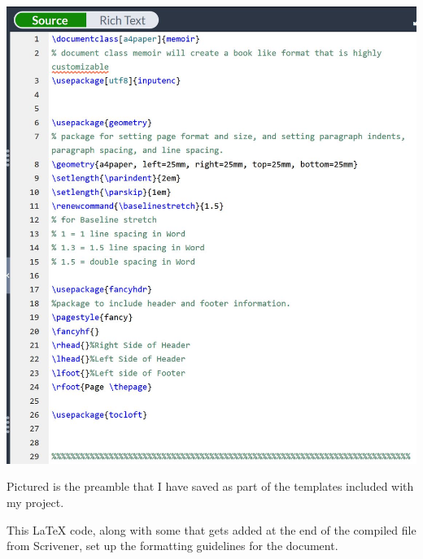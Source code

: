 \documentclass[unknownkeysallowed,usepdftitle=false, aspectratio=169,parskip=full]{beamer}
\newcommand{\secvariable}{nothing}
\newcommand{\mysection}[1]{\renewcommand{\secvariable}{#1}
}
\begin{document}
\mysection{line}
\begin{frame}\label{\secvariable}
\begin{center}
  \vspace{-0.5cm}
 \includegraphics[height=0.65\textheight,keepaspectratio]{Images/OverleafCode.JPG}
\end{center}
  \vspace{-0.5cm}
  
  Pictured is the preamble that I have saved as part of the templates included with my project. 
  
  This LaTeX code, along with some that gets added at the end of the compiled file from Scrivener, set up the formatting guidelines for the document.

  
\end{frame}
\end{document}
